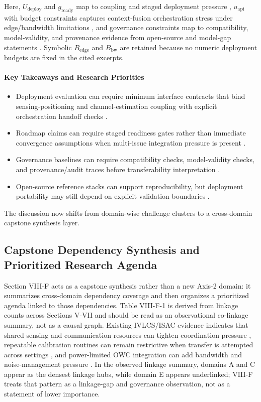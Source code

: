 Here, $U_{\mathrm{deploy}}$ and $g_{\mathrm{ready}}$ map to coupling and staged deployment pressure \cite{O_ISAC_039, O_ISAC_163}, $u_{\mathrm{api}}$ with budget constraints captures context-fusion orchestration stress under edge/bandwidth limitations \cite{O_ISAC_151}, and governance constraints map to compatibility, model-validity, and provenance evidence from open-source and model-gap statements \cite{O_ISAC_200}. Symbolic $B_{\mathrm{edge}}$ and $B_{\mathrm{bw}}$ are retained because no numeric deployment budgets are fixed in the cited excerpts.

\paragraph{Key Takeaways and Research Priorities}
\begin{itemize}
    \item Deployment evaluation can require minimum interface contracts that bind sensing-positioning and channel-estimation coupling with explicit orchestration handoff checks \cite{O_ISAC_039, O_ISAC_151}.
    \item Roadmap claims can require staged readiness gates rather than immediate convergence assumptions when multi-issue integration pressure is present \cite{O_ISAC_163}.
    \item Governance baselines can require compatibility checks, model-validity checks, and provenance/audit traces before transferability interpretation \cite{O_ISAC_200}.
    \item Open-source reference stacks can support reproducibility, but deployment portability may still depend on explicit validation boundaries \cite{O_ISAC_200}.
\end{itemize}

The discussion now shifts from domain-wise challenge clusters to a cross-domain capstone synthesis layer.

\subsection{Capstone Dependency Synthesis and Prioritized Research Agenda}

Section VIII-F acts as a capstone synthesis rather than a new Axis-2 domain: it summarizes cross-domain dependency coverage and then organizes a prioritized agenda linked to those dependencies. Table VIII-F-1 is derived from linkage counts across Sections V-VII and should be read as an observational co-linkage summary, not as a causal graph. Existing IVLCS/ISAC evidence indicates that shared sensing and communication resources can tighten coordination pressure \cite{O_ISAC_049}, repeatable calibration routines can remain restrictive when transfer is attempted across settings \cite{O_ISAC_107}, and power-limited OWC integration can add bandwidth and noise-management pressure \cite{O_ISAC_133}. In the observed linkage summary, domains A and C appear as the densest linkage hubs, while domain E appears underlinked; VIII-F treats that pattern as a linkage-gap and governance observation, not as a statement of lower importance.

